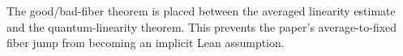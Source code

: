 
The good/bad-fiber theorem is placed between the averaged linearity estimate
and the quantum-linearity theorem. This prevents the paper's average-to-fixed
fiber jump from becoming an implicit Lean assumption.


